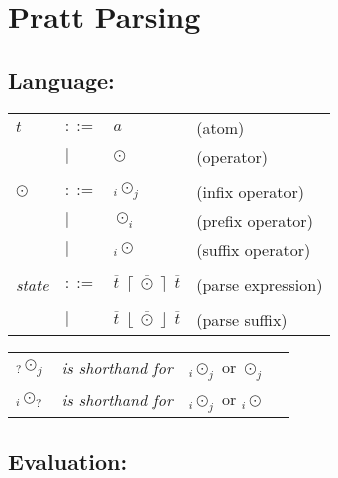 \documentclass{article}
\makeatletter
\newenvironment{Table}
  {\begin{center}\begin{tabular}{l l l @{\quad}l}}
  {\end{tabular}\end{center}}
\makeatother
\begin{document}
\newcommand{\seq}[1]{\overline{#1}}
\newcommand{\state}[4]{#1 \;\, \big\langle\; #2 \;\big\rangle_{\!\bold#4} \;\, #3}
\newcommand{\estate}[3]{#1 \;\, \big\lceil\; #2 \;\big\rceil \;\, #3}
\newcommand{\sstate}[3]{#1 \;\, \big\lfloor\; #2 \;\big\rfloor \;\, #3}
\newcommand{\atom}{{a}}
\newcommand{\op}{{\odot}}
\newcommand{\infix}[2]{{}_{#1}\op_{#2}}
\newcommand{\suffix}[1]{{}_{#1}\op}
\newcommand{\prefix}[1]{\op_{#1}}
\newcommand{\s}{\;\;}
\newcommand{\lprec}[1]{\textit{lprec}(#1)}
\newcommand{\rprec}[1]{\textit{rprec}(#1)}
\newcommand{\none}{\emptyset}
\newcommand{\juxt}{\textit{J}}
\newcommand{\miss}{\textit{M}}

\section{Pratt Parsing}

\subsection{Language:}

\begin{Table}
$t$ &$::=$& $\atom$ &(atom) \\
&$|$& $\op$ &(operator) \\
\\
$\op$ &$::=$& $\infix{i}{j}$ &(infix operator) \\
&$|$& $\prefix{i}$ &(prefix operator) \\
&$|$& $\suffix{i}$ &(suffix operator) \\
\\
 \textit{state} &$::=$& $\estate{\seq{t}}{\seq{\op}}{\seq{t}}$ & (parse expression) \\
 \\
 &$|$& $\sstate{\seq{t}}{\seq{\op}}{\seq{t}}$ & (parse suffix)
\end{Table}

\begin{Table}
$\infix{?}{j}$ &\textit{is shorthand for}& $\infix{i}{j}$ or $\prefix{j}$ \\
$\infix{i}{?}$ &\textit{is shorthand for}& $\infix{i}{j}$ or $\suffix{i}$ \\
\end{Table}

\subsection{Evaluation:}
\end{document}
